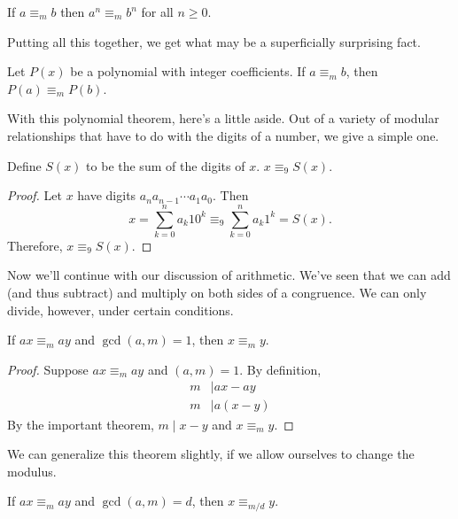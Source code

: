 \documentclass[../m55main.tex]{subfiles}
\begin{document}

\begin{corollary}
    If $a \equiv_m b$ then $a^n \equiv_m b^n$ for all $n \geq 0$.
\end{corollary}

Putting all this together, we get what may be a superficially surprising fact.

\begin{corollary}
    Let $P(x)$ be a polynomial with integer coefficients.
    If $a \equiv_m b$, then $P(a) \equiv_m P(b)$.
\end{corollary}


With this polynomial theorem, here's a little aside.
Out of a variety of modular relationships that have to do with the digits of a number, we give a simple one.

\begin{theorem}
    Define $S(x)$ to be the sum of the digits of $x$.
    $x \equiv_9 S(x)$.
\end{theorem}

\begin{proof}
    Let $x$ have digits $a_n a_{n-1} \cdots a_1 a_0$.
    Then
    \[ x = \sum_{k=0}^n a_k 10^k \equiv_9 \sum_{k=0}^n a_k 1^k = S(x). \]
    Therefore, $x \equiv_9 S(x)$.
\end{proof}

Now we'll continue with our discussion of arithmetic.
We've seen that we can add (and thus subtract) and multiply on both sides of a congruence.
We can only divide, however, under certain conditions.

\begin{theorem}
    If $ax \equiv_m ay$ and $\gcd (a,m) = 1$, then $x \equiv_m y$.
\end{theorem}

\begin{proof}
    Suppose $ax \equiv_m ay$ and $(a,m) = 1$.
    By definition,
    \begin{align*}
        m &\mid ax - ay \\
        m &\mid a (x - y)
    \end{align*}
    By the important theorem, $m \mid x - y$ and $x \equiv_m y$.
\end{proof}

We can generalize this theorem slightly, if we allow ourselves to change the modulus.

\begin{theorem}
    If $ax \equiv_m ay$ and $\gcd (a,m) = d$, then $x \equiv_{m/d} y$.
\end{theorem}
\end{document}
